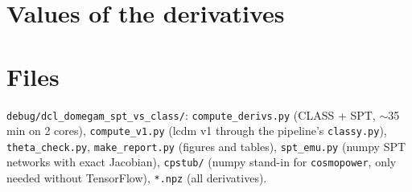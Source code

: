 \documentclass[10pt]{article}
\newcommand{\om}{\omega_m}
\begin{document}
\appendix
\section{Values of the derivatives}

\begin{table}[H]
\centering\small
\caption{$TT$: $D_\ell$ and $\partial D_\ell/\partial\om|_{\theta_s}$ from the five methods ($\mu{\rm K}^2$).}

\end{table}
\begin{table}[H]
\centering\small
\caption{$TE$: $D_\ell$ and $\partial D_\ell/\partial\om|_{\theta_s}$ from the five methods ($\mu{\rm K}^2$).}

\end{table}
\begin{table}[H]
\centering\small
\caption{$EE$: $D_\ell$ and $\partial D_\ell/\partial\om|_{\theta_s}$ from the five methods ($\mu{\rm K}^2$).}

\end{table}

\section{Files}
\texttt{debug/dcl\_domegam\_spt\_vs\_class/}: \texttt{compute\_derivs.py} (CLASS + SPT, $\sim$35 min on 2 cores),
\texttt{compute\_v1.py} (lcdm v1 through the pipeline's \texttt{classy.py}), \texttt{theta\_check.py},
\texttt{make\_report.py} (figures and tables), \texttt{spt\_emu.py} (numpy SPT networks with exact Jacobian),
\texttt{cpstub/} (numpy stand-in for \texttt{cosmopower}, only needed without TensorFlow), \texttt{*.npz} (all
derivatives).
\end{document}

